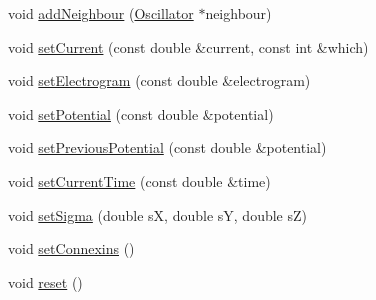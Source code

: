 \begin{DoxyCompactItemize}
void \hyperlink{class_oscillator_af5cd9a1f69c6e31748d54128a68628f8}{add\+Neighbour} (\hyperlink{class_oscillator}{Oscillator} $\ast$neighbour)
\item 
void \hyperlink{class_oscillator_a5e4ecacba9fc577660c1643c1e50e0bb}{set\+Current} (const double \&current, const int \&which)
\item 
void \hyperlink{class_oscillator_a42171f7e11ac041ab982d055ba389352}{set\+Electrogram} (const double \&electrogram)
\item 
void \hyperlink{class_oscillator_a91b56c7ed7c11f30109e8b1db296b2a6}{set\+Potential} (const double \&potential)
\item 
void \hyperlink{class_oscillator_a3e24a7637ed5aaf05101f3e115ea8e9c}{set\+Previous\+Potential} (const double \&potential)
\item 
void \hyperlink{class_oscillator_ae4fdf768b4fc00f6830c295cdc2f3e62}{set\+Current\+Time} (const double \&time)
\item 
void \hyperlink{class_oscillator_a549fcc8c0dc9a0789a062a0b1062610b}{set\+Sigma} (double s\+X, double s\+Y, double s\+Z)
\item 
void \hyperlink{class_oscillator_a8d4b8d2c8eb200afbbb4d4d999f068ab}{set\+Connexins} ()
\item 
void \hyperlink{class_oscillator_aa948fd93ed91ffedd873c6d50bba3898}{reset} ()
\end{DoxyCompactItemize}
